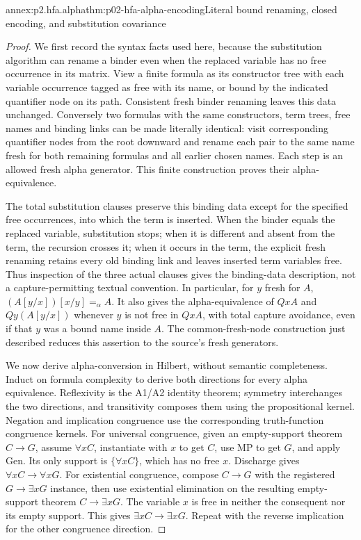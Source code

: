 \begin{annexitem}{annex:p2.hfa.alpha}{thm:p02-hfa-alpha-encoding}{Literal bound renaming, closed encoding, and substitution covariance}
\begin{proof}
We first record the syntax facts used here, because the substitution
algorithm can rename a binder even when the replaced variable has no
free occurrence in its matrix. View a finite formula as its constructor
tree with each variable occurrence tagged as free with its name, or
bound by the indicated quantifier node on its path. Consistent fresh
binder renaming leaves this data unchanged. Conversely two formulas
with the same constructors, term trees, free names and binding links
can be made literally identical: visit corresponding quantifier nodes
from the root downward and rename each pair to the same name fresh
for both remaining formulas and all earlier chosen names. Each step
is an allowed fresh alpha generator. This finite construction proves
their alpha-equivalence.

The total substitution clauses preserve this binding data except for
the specified free occurrences, into which the term is inserted. When
the binder equals the replaced variable, substitution stops; when it
is different and absent from the term, the recursion crosses it; when
it occurs in the term, the explicit fresh renaming retains every old
binding link and leaves inserted term variables free. Thus inspection
of the three actual clauses gives the binding-data description, not
a capture-permitting textual convention. In particular, for \(y\)
fresh for \(A\),
\((A[y/x])[x/y]=_{\alpha}A\). It also gives the alpha-equivalence
of \(QxA\) and \(Qy(A[y/x])\) whenever \(y\) is not free in
\(QxA\), with total capture avoidance, even if that \(y\) was a
bound name inside \(A\). The common-fresh-node construction just
described reduces this assertion to the source's fresh generators.

We now derive alpha-conversion in Hilbert, without semantic completeness.
Induct on formula complexity to derive both directions for every alpha
equivalence. Reflexivity is the A1/A2 identity theorem; symmetry
interchanges the two directions, and transitivity composes them using
the propositional kernel. Negation and implication congruence use the
corresponding truth-function congruence kernels. For universal congruence,
given an empty-support theorem \(C\to G\), assume \(\forall xC\),
instantiate with \(x\) to get \(C\), use MP to get \(G\), and
apply Gen. Its only support is \(\{\forall xC\}\), which has no
free \(x\). Discharge gives \(\forall xC\to\forall xG\).
For existential congruence, compose \(C\to G\) with the registered
\(G\to\exists xG\) instance, then use existential elimination
on the resulting empty-support theorem \(C\to\exists xG\).
The variable \(x\) is free in neither the consequent nor its empty
support. This gives \(\exists xC\to\exists xG\). Repeat with
the reverse implication for the other congruence direction.


\end{proof}
\end{annexitem}
